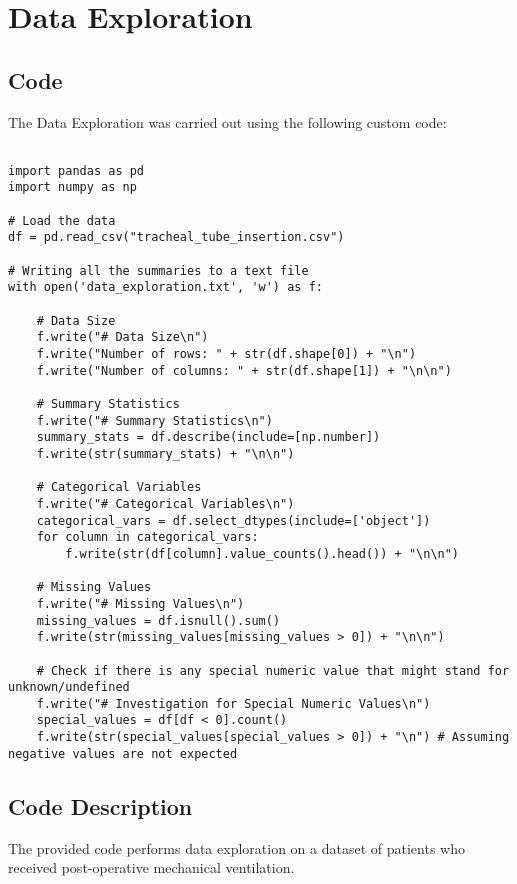 \documentclass[11pt]{article}
\begin{document}
\section{Data Exploration}
\subsection{{Code}}
The Data Exploration was carried out using the following custom code:

\begin{verbatim}

import pandas as pd
import numpy as np

# Load the data
df = pd.read_csv("tracheal_tube_insertion.csv")

# Writing all the summaries to a text file
with open('data_exploration.txt', 'w') as f:

    # Data Size
    f.write("# Data Size\n")
    f.write("Number of rows: " + str(df.shape[0]) + "\n")
    f.write("Number of columns: " + str(df.shape[1]) + "\n\n")

    # Summary Statistics
    f.write("# Summary Statistics\n")
    summary_stats = df.describe(include=[np.number])
    f.write(str(summary_stats) + "\n\n")

    # Categorical Variables
    f.write("# Categorical Variables\n")
    categorical_vars = df.select_dtypes(include=['object'])
    for column in categorical_vars:
        f.write(str(df[column].value_counts().head()) + "\n\n")

    # Missing Values
    f.write("# Missing Values\n")
    missing_values = df.isnull().sum()
    f.write(str(missing_values[missing_values > 0]) + "\n\n")

    # Check if there is any special numeric value that might stand for unknown/undefined
    f.write("# Investigation for Special Numeric Values\n")
    special_values = df[df < 0].count()
    f.write(str(special_values[special_values > 0]) + "\n") # Assuming negative values are not expected

\end{verbatim}

\subsection{Code Description}

The provided code performs data exploration on a dataset of patients who received post-operative mechanical ventilation. 
\end{document}
